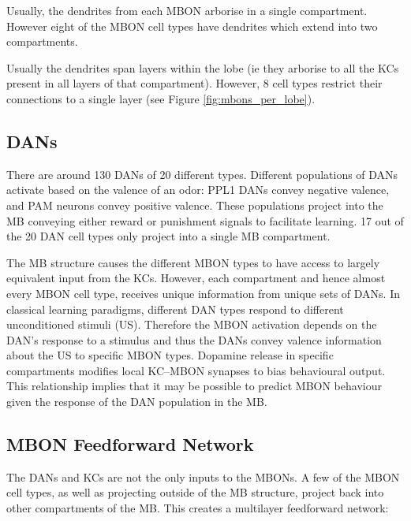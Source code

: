 \documentclass[11pt, A4]{article}
\begin{document}
\begin{multicols}{2}
Usually, the dendrites from each MBON arborise in a single compartment. However eight of the MBON cell types have dendrites which extend into two compartments.

Usually the dendrites span layers within the lobe (ie they arborise to all the KCs present in all layers of that compartment). However, 8 cell types restrict their connections to a single layer (see Figure \ref{fig:mbons_per_lobe}).


\subsection{DANs}
There are around 130 DANs of 20 different types. Different populations of DANs activate based on the valence of an odor: PPL1 DANs convey negative valence, and PAM neurons convey positive valence. These populations project into the MB conveying either reward or punishment signals to facilitate learning. 17 out of the 20 DAN cell types only project into a single MB compartment.

The MB structure causes the different MBON types to have access to largely equivalent input from the KCs. However, each compartment and hence almost every MBON cell type, receives unique information from unique sets of DANs. In classical learning paradigms, different DAN types respond to different unconditioned stimuli (US). Therefore the MBON activation depends on the DAN's response to a stimulus and thus the DANs convey valence information about the US to specific MBON types. Dopamine release in specific compartments modifies local KC–MBON synapses to bias behavioural output. This relationship implies that it may be possible to predict MBON behaviour given the response of the DAN population in the MB. 


\subsection{MBON Feedforward Network}

The DANs and KCs are not the only inputs to the MBONs. A few of the MBON cell types, as well as projecting outside of the MB structure, project back into other compartments of the MB. This creates a multilayer feedforward network:


\end{multicols}
\end{document}
